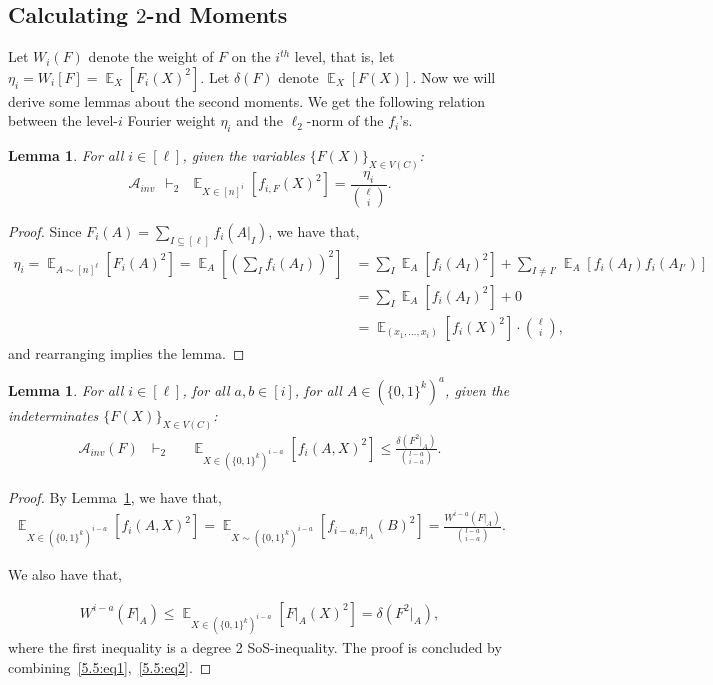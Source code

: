 \documentclass[11pt]{article}
\DeclareMathOperator*{\E}{\mathbb{E}}
\def \cA {\mathcal{A}}
\newtheorem{lemma}[theorem]{Lemma}
\theoremstyle{definition}
\begin{document}
\subsection{Calculating $2$-nd Moments}
Let $W_i(F)$ denote the weight of $F$ on the $i^{th}$ level, that is, let $\eta_i = W_i[F] = \E_X[F_i(X)^2]$. Let $\delta(F)$ denote $\E_X[F(X)]$. Now we will derive some lemmas about the second moments. We get the following relation between the level-$i$ Fourier weight $\eta_i$ and the $\ell_2$-norm of the $f_i$'s.

\begin{lemma}\label{lem:3.2}
For all $i \in [\ell]$, given the variables $\{F(X)\}_{X \in V(C)}$:
$$\cA_{inv} ~~\vdash_2 ~~\E_{X \in [n]^{i}}[f_{i,F}(X)^2] =  \frac{\eta_{i}}{\binom{\ell}{i}}.$$
\end{lemma}

\begin{proof}
Since $F_i(A) = \sum_{I \subseteq [\ell]}f_i(A|_I)$, we have that, 
\begin{align*}
    \eta_i=\E_{A \sim [n]^{\ell}}[F_i(A)^2] = 
    \E_A[(\sum_I f_i(A_I))^2] 
    &= \sum_I \E_A[ f_i(A_I)^2] + \sum_{I \neq I'} \E_{A}[f_i(A_I)f_i(A_{I'})] \\
    &= \sum_I \E_A[ f_i(A_I)^2] + 0 \\
    &= \E_{(x_1,\ldots,x_i)}[f_i(X)^2] \cdot \binom{\ell}{i},
\end{align*}
and rearranging implies the lemma. 
\end{proof}




\begin{lemma}\label{lem:p.r.-weight}
For all $i \in [\ell]$, for all $a,b \in [i]$, for all $A \in (\{0,1\}^k)^a$, given the indeterminates $\{F(X)\}_{X \in V(C)}$:
\begin{align*}
\cA_{inv}(F) ~~~\vdash_2 ~~~ &\E_{X \in (\{0,1\}^k)^{i-a}}[f_i(A,X)^2] \leq \frac{\delta(F^{ 2}|_A)}{{l-a \choose i-a}}.
\end{align*}
\end{lemma}

\begin{proof}
By Lemma~\ref{lem:3.2}, we have that,
\begin{align}
\E_{X \in (\{0,1\}^k)^{i-a}}[f_i(A,X)^2] = \E_{X \sim (\{0,1\}^k)^{i-a}}[f_{i-a,F|_A}(B)^2] = \frac{W^{i-a}(F|_A)}{{l-a \choose i-a}}. \label{5.5:eq1}
\end{align}

We also have that,

\begin{align}
W^{i-a}(F|_A) \leq \E_{X \in (\{0,1\}^k)^{i-a}}[F|_A(X)^2] = \delta(F^{ 2}|_A), \label{5.5:eq2}
\end{align}
where the first inequality is a degree 2 SoS-inequality. The proof is concluded by combining~\eqref{5.5:eq1},~\eqref{5.5:eq2}.
\end{proof}
\end{document}
